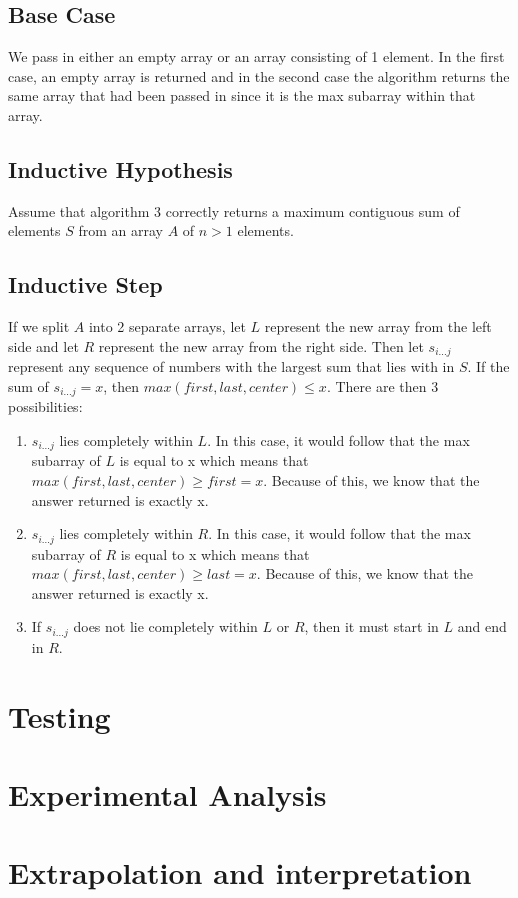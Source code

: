 \documentclass[11pt,letterpaper]{article}
\begin{document}
\subsection*{Base Case}
We pass in either an empty array or an array consisting of 1 element. In the first case, an empty array is returned and in the second case the algorithm returns the same array that had been passed in since it is the max subarray within that array.

\subsection*{Inductive Hypothesis}
Assume that algorithm 3 correctly returns a maximum contiguous sum of elements $S$ from an array $A$ of $n > 1$ elements. 

\subsection*{Inductive Step}
If we split $A$ into 2 separate arrays, let $L$ represent the new array from the left side and let $R$ represent the new array from the right side. Then let $s_{i...j}$ represent any sequence of numbers with the largest sum that lies with in $S$. If the sum of $s_{i...j} = x$, then $max(first, last, center) \leq x$. There are then 3 possibilities:
\begin{enumerate}
\item $s_{i...j}$ lies completely within $L$. In this case, it would follow that the max subarray of $L$ is equal to x which means that $max(first, last, center) \geq first = x$. Because of this, we know that the answer returned is exactly x.
\item $s_{i...j}$ lies completely within $R$. In this case, it would follow that the max subarray of $R$ is equal to x which means that $max(first, last, center) \geq last = x$. Because of this, we know that the answer returned is exactly x.
\item If $s_{i...j}$ does not lie completely within $L$ or $R$, then it must start in $L$ and end in $R$. 
\end{enumerate}

\section{Testing}


\section{Experimental Analysis}


\section{Extrapolation and interpretation}
\end{document}
